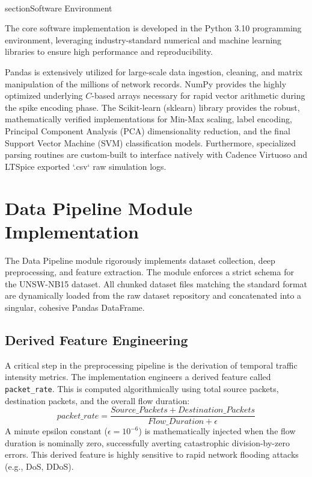 \\section{Software Environment}

The core software implementation is developed in the Python 3.10 programming environment, leveraging industry-standard numerical and machine learning libraries to ensure high performance and reproducibility. 

Pandas is extensively utilized for large-scale data ingestion, cleaning, and matrix manipulation of the millions of network records. NumPy provides the highly optimized underlying $C$-based arrays necessary for rapid vector arithmetic during the spike encoding phase. The Scikit-learn (sklearn) library provides the robust, mathematically verified implementations for Min-Max scaling, label encoding, Principal Component Analysis (PCA) dimensionality reduction, and the final Support Vector Machine (SVM) classification models. Furthermore, specialized parsing routines are custom-built to interface natively with Cadence Virtuoso and LTSpice exported `.csv` raw simulation logs.

\section{Data Pipeline Module Implementation}

The Data Pipeline module rigorously implements dataset collection, deep preprocessing, and feature extraction. The module enforces a strict schema for the UNSW-NB15 dataset. All chunked dataset files matching the standard format are dynamically loaded from the raw dataset repository and concatenated into a singular, cohesive Pandas DataFrame.

\subsection{Derived Feature Engineering}
A critical step in the preprocessing pipeline is the derivation of temporal traffic intensity metrics. The implementation engineers a derived feature called \texttt{packet\_rate}. This is computed algorithmically using total source packets, destination packets, and the overall flow duration:
\begin{equation}
packet\_rate = \frac{Source\_Packets + Destination\_Packets}{Flow\_Duration + \epsilon}
\end{equation}
A minute epsilon constant ($\epsilon = 10^{-6}$) is mathematically injected when the flow duration is nominally zero, successfully averting catastrophic division-by-zero errors. This derived feature is highly sensitive to rapid network flooding attacks (e.g., DoS, DDoS).

